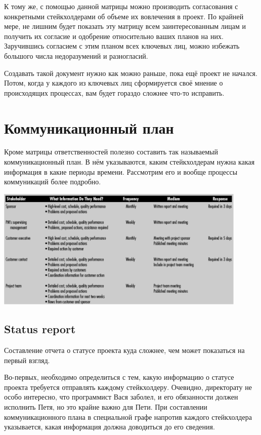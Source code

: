 \documentclass{../../text-style}
\begin{document}
К тому же, с помощью данной матрицы можно производить согласования с конкретными стейкхолдерами об объеме их вовлечения в проект. По крайней мере, не лишним будет показать эту матрицу всем заинтересованным лицам и получить их согласие и одобрение относительно ваших планов на них. Заручившись согласием с этим планом всех ключевых лиц, можно избежать большого числа недоразумений и разногласий.

Создавать такой документ нужно как можно раньше, пока ещё проект не начался. Потом, когда у каждого из ключевых лиц сформируется своё мнение о происходящих процессах, вам будет гораздо сложнее что-то исправить.

\section{Коммуникационный план}

Кроме матрицы ответственностей полезно составить так называемый коммуникационный план. В нём указываются, каким стейкхолдерам нужна какая информация в какие периоды времени. Рассмотрим его и вообще процессы коммуникаций более подробно.

\begin{center}
    \includegraphics[width=0.9\textwidth]{communicationPlan.png}
\end{center}

\subsection{Status report}

Составление отчета о статусе проекта куда сложнее, чем может показаться на первый взгляд.

Во-первых, необходимо определиться с тем, какую информацию о статусе проекта требуется отправлять каждому стейкхолдеру. Очевидно, директорату не особо интересно, что программист Вася заболел, и его обязанности должен исполнить Петя, но это крайне важно для Пети. При составлении коммуникационного плана в специальной графе напротив каждого стейкхолдера указывается, какая информация должна доводиться до его сведения.
\end{document}
